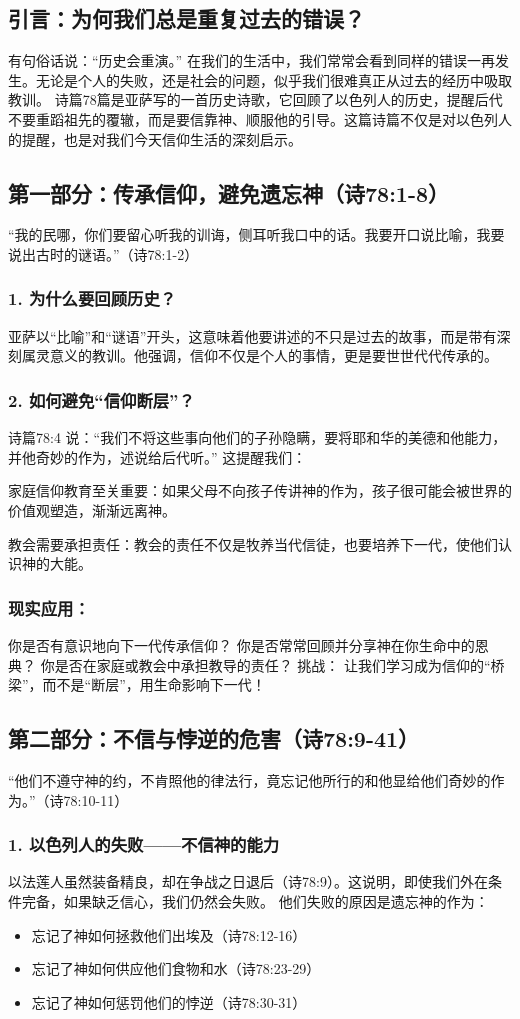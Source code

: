 \documentclass[a4paper, 12pt]{article}
\begin{document}
\subsection*{引言：为何我们总是重复过去的错误？}
有句俗话说：“历史会重演。” 在我们的生活中，我们常常会看到同样的错误一再发生。无论是个人的失败，还是社会的问题，似乎我们很难真正从过去的经历中吸取教训。
诗篇78篇是亚萨写的一首历史诗歌，它回顾了以色列人的历史，提醒后代不要重蹈祖先的覆辙，而是要信靠神、顺服他的引导。这篇诗篇不仅是对以色列人的提醒，也是对我们今天信仰生活的深刻启示。
\subsection*{第一部分：传承信仰，避免遗忘神（诗78:1-8）}
“我的民哪，你们要留心听我的训诲，侧耳听我口中的话。我要开口说比喻，我要说出古时的谜语。”（诗78:1-2）
\subsubsection*{1. 为什么要回顾历史？}
亚萨以“比喻”和“谜语”开头，这意味着他要讲述的不只是过去的故事，而是带有深刻属灵意义的教训。他强调，信仰不仅是个人的事情，更是要世世代代传承的。
\subsubsection*{2. 如何避免“信仰断层”？}
诗篇78:4 说：“我们不将这些事向他们的子孙隐瞒，要将耶和华的美德和他能力，并他奇妙的作为，述说给后代听。” 这提醒我们：

家庭信仰教育至关重要：如果父母不向孩子传讲神的作为，孩子很可能会被世界的价值观塑造，渐渐远离神。

教会需要承担责任：教会的责任不仅是牧养当代信徒，也要培养下一代，使他们认识神的大能。
\subsubsection*{现实应用：}
你是否有意识地向下一代传承信仰？
你是否常常回顾并分享神在你生命中的恩典？
你是否在家庭或教会中承担教导的责任？
挑战： 让我们学习成为信仰的“桥梁”，而不是“断层”，用生命影响下一代！
\subsection*{第二部分：不信与悖逆的危害（诗78:9-41）}
“他们不遵守神的约，不肯照他的律法行，竟忘记他所行的和他显给他们奇妙的作为。”（诗78:10-11）
\subsubsection*{1. 以色列人的失败——不信神的能力}
以法莲人虽然装备精良，却在争战之日退后（诗78:9）。这说明，即使我们外在条件完备，如果缺乏信心，我们仍然会失败。
他们失败的原因是遗忘神的作为：
\begin{itemize}
    \item 忘记了神如何拯救他们出埃及（诗78:12-16）

    \item 忘记了神如何供应他们食物和水（诗78:23-29）

    \item 忘记了神如何惩罚他们的悖逆（诗78:30-31）

\end{itemize}
\end{document}

